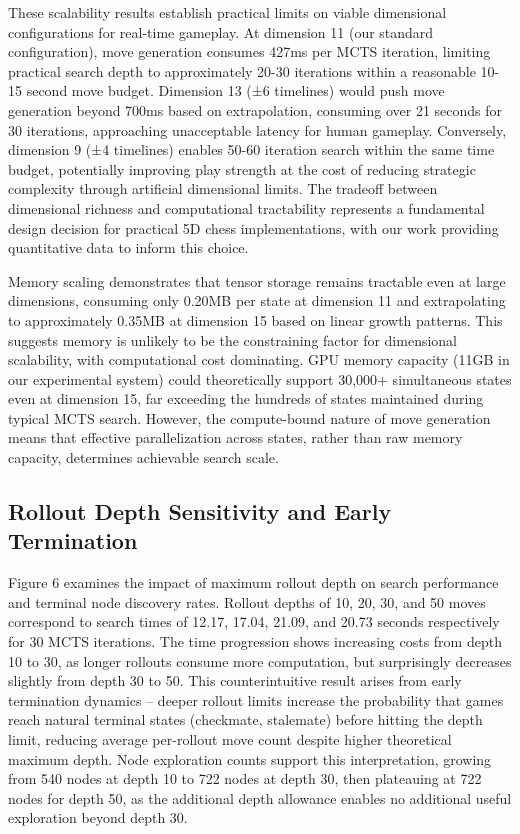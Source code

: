 \documentclass{article}
\begin{document}
These scalability results establish practical limits on viable dimensional configurations for real-time gameplay. At dimension 11 (our standard configuration), move generation consumes 427ms per MCTS iteration, limiting practical search depth to approximately 20-30 iterations within a reasonable 10-15 second move budget. Dimension 13 (±6 timelines) would push move generation beyond 700ms based on extrapolation, consuming over 21 seconds for 30 iterations, approaching unacceptable latency for human gameplay. Conversely, dimension 9 (±4 timelines) enables 50-60 iteration search within the same time budget, potentially improving play strength at the cost of reducing strategic complexity through artificial dimensional limits. The tradeoff between dimensional richness and computational tractability represents a fundamental design decision for practical 5D chess implementations, with our work providing quantitative data to inform this choice.

Memory scaling demonstrates that tensor storage remains tractable even at large dimensions, consuming only 0.20MB per state at dimension 11 and extrapolating to approximately 0.35MB at dimension 15 based on linear growth patterns. This suggests memory is unlikely to be the constraining factor for dimensional scalability, with computational cost dominating. GPU memory capacity (11GB in our experimental system) could theoretically support 30,000+ simultaneous states even at dimension 15, far exceeding the hundreds of states maintained during typical MCTS search. However, the compute-bound nature of move generation means that effective parallelization across states, rather than raw memory capacity, determines achievable search scale.

\subsection{Rollout Depth Sensitivity and Early Termination}

Figure 6 examines the impact of maximum rollout depth on search performance and terminal node discovery rates. Rollout depths of 10, 20, 30, and 50 moves correspond to search times of 12.17, 17.04, 21.09, and 20.73 seconds respectively for 30 MCTS iterations. The time progression shows increasing costs from depth 10 to 30, as longer rollouts consume more computation, but surprisingly decreases slightly from depth 30 to 50. This counterintuitive result arises from early termination dynamics – deeper rollout limits increase the probability that games reach natural terminal states (checkmate, stalemate) before hitting the depth limit, reducing average per-rollout move count despite higher theoretical maximum depth. Node exploration counts support this interpretation, growing from 540 nodes at depth 10 to 722 nodes at depth 30, then plateauing at 722 nodes for depth 50, as the additional depth allowance enables no additional useful exploration beyond depth 30.
\end{document}
